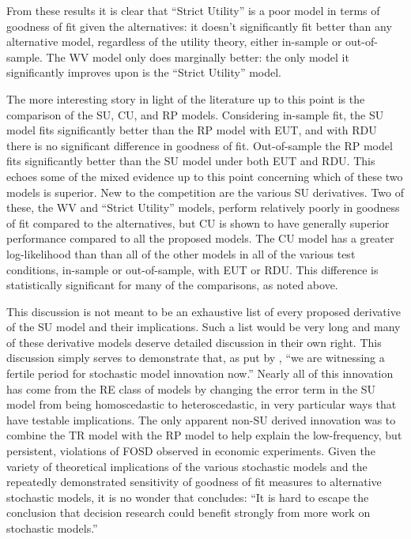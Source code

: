 \documentclass[../main.tex]{subfiles}
\begin{document}
From these results it is clear that \enquote{Strict Utility} is a poor model in terms of goodness of fit given the alternatives: it doesn't significantly fit better than any alternative model, regardless of the utility theory, either in-sample or out-of-sample.
The WV model only does marginally better: the only model it significantly improves upon is the \enquote{Strict Utility} model.

The more interesting story in light of the literature up to this point is the comparison of the SU, CU, and RP models.
Considering in-sample fit, the SU model fits significantly better than the RP model with EUT, and with RDU there is no significant difference in goodness of fit.
Out-of-sample the RP model fits  significantly better than the SU model under both EUT and RDU.
This echoes some of the mixed evidence up to this point concerning which of these two models is superior.
New to the competition are the various SU derivatives.
Two of these, the WV and \enquote{Strict Utility} models, perform relatively poorly in goodness of fit compared to the alternatives, but CU is shown to have generally superior performance compared to all the proposed models.
The CU model has a greater log-likelihood than than all of the other models in all of the various test conditions, in-sample or out-of-sample, with EUT or RDU.
This difference is statistically significant for many of the comparisons, as noted above.

This discussion is not meant to be an exhaustive list of every proposed derivative of the SU model and their implications.
Such a list would be very long and many of these derivative models deserve detailed discussion in their own right.
This discussion simply serves to demonstrate that, as put by \textcite[277]{Wilcox2008}, \enquote{we are witnessing a fertile period for stochastic model innovation now.}
Nearly all of this innovation has come from the RE class of models by changing the error term in the SU model from being homoscedastic to heteroscedastic, in very particular ways that have testable implications.
The only apparent non-SU derived innovation was to combine the TR model with the RP model to help explain the low-frequency, but persistent, violations of FOSD observed in economic experiments.{\footnotemark}
Given the variety of theoretical implications of the various stochastic models and the repeatedly demonstrated sensitivity of goodness of fit measures to alternative stochastic models, it is no wonder that \textcite[275]{Wilcox2008} concludes: \enquote{It is hard to escape the conclusion that decision research could benefit strongly from more work on stochastic models.}
\end{document}
